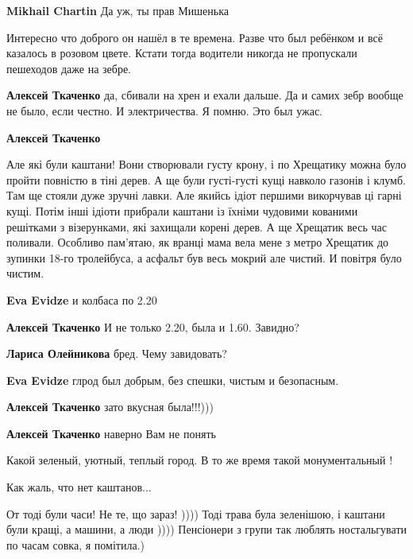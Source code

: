 \begin{itemize}
\begin{itemize}
\textbf{Mikhail Chartin} Да уж, ты прав Мишенька
\end{itemize} %


Интересно что доброго он нашёл в те времена. Разве что был ребёнком и всё
казалось в розовом цвете. Кстати тогда водители никогда не пропускали пешеходов
даже на зебре.

\begin{itemize} %
\textbf{Алексей Ткаченко} да, сбивали на хрен и ехали дальше. Да и самих зебр вообще не было, если честно. И электричества. Я помню. Это был ужас.

\textbf{Алексей Ткаченко} 

Але які були каштани! Вони створювали густу крону, і по Хрещатику можна було
пройти повністю в тіні дерев. А ще були густі-густі кущі навколо газонів і
клумб. Там ще стояли дуже зручні лавки. Але якийсь ідіот першими викорчував ці
гарні кущі. Потім інші ідіоти прибрали каштани із їхніми чудовими кованими
решітками з візерунками, які захищали корені дерев. А ще Хрещатик весь час
поливали. Особливо пам'ятаю, як вранці мама вела мене з метро Хрещатик до
зупинки 18-го тролейбуса, а асфальт був весь мокрий але чистий. И повітря було
чистим.

\begin{itemize} %
\textbf{Eva Evidze} и колбаса по 2.20

\textbf{Алексей Ткаченко} И не только 2.20, была и 1.60. Завидно?

\textbf{Лариса Олейникова} бред. Чему завидовать?

\textbf{Eva Evidze} глрод был добрым, без спешки, чистым и безопасным.

\textbf{Алексей Ткаченко} зато вкусная была!!!)))
\end{itemize} %

\textbf{Алексей Ткаченко} наверно Вам не понять

\end{itemize} %

Какой зеленый, уютный, теплый город. В то же время такой монументальный !

Как жаль, что нет каштанов...


От тоді були часи! Не те, що зараз! )))) Тоді трава була зеленішою, і каштани
були кращі, а машини, а люди )))) Пенсіонери з групи так люблять ностальгувати
по часам совка, я помітила.)


\end{itemize}
